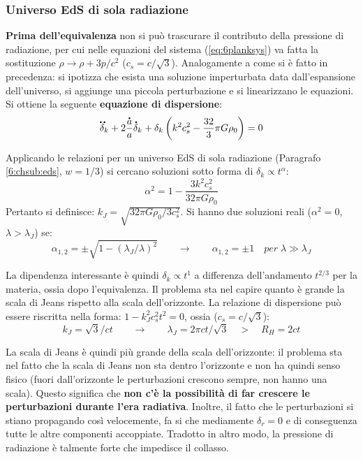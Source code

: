 \subsubsection{Universo EdS di sola radiazione}
\textbf{Prima dell'equivalenza} non si può trascurare il contributo della pressione di radiazione, per cui nelle equazioni del sistema (\ref{eq:6planksys}) va fatta la sostituzione $\rho \rightarrow \rho + 3p/c^2$ ($c_s=c/\sqrt{3}$). Analogamente a come si è fatto in precedenza: si ipotizza che esista una soluzione imperturbata data dall'espansione dell'universo, si aggiunge una piccola perturbazione e si linearizzano le equazioni. Si ottiene la seguente \textbf{equazione di dispersione}:
\begin{equation}
    \accentset{\mbox{\large\bfseries ..}}{\delta}_k + 2 \frac{\accentset{\mbox{\large\bfseries .}}{a}}{a}\accentset{\mbox{\large\bfseries .}}{\delta}_k + \delta_k \left( k^2 c_s^2 -\frac{32}{3}\pi G \rho_0\right) =0
\end{equation}

Applicando le relazioni per un universo EdS di sola radiazione (Paragrafo \ref{6:chsub:eds}, $w=1/3$) si cercano soluzioni sotto forma di $\delta_k \propto t^{\alpha}$:
\begin{equation*}
    \alpha^2 = 1-\frac{3k^2c_s^2}{32 \pi G\rho_0}
\end{equation*}
Pertanto si definisce: $k_J=\sqrt{32\pi G \rho_0 / 3c_s^2}$. Si hanno due soluzioni reali ($\alpha^2=0$, $\lambda >\lambda_J$) se:
\begin{equation*}
    \alpha_{1,2}=\pm \sqrt{1-\left( \lambda_J /\lambda\right)^2}\qquad \rightarrow \qquad \alpha_{1,2}=\pm 1 \quad per\; \lambda \gg \lambda_J
\end{equation*}

La dipendenza interessante è quindi $\delta_k \propto t^1$ a differenza dell'andamento $t^{2/3}$ per la materia, ossia dopo l'equivalenza. Il problema sta nel capire quanto è grande la scala di Jeans rispetto alla scala dell'orizzonte. La relazione di dispersione può essere riscritta nella forma: $1-k_J^2c_s^2t^2 = 0$, ossia ($c_s=c/\sqrt{3}$): 
\begin{equation*}
    k_J = \sqrt{3}/ct \qquad\rightarrow \qquad \lambda_J = 2\pi c t /\sqrt{3} \quad > \quad R_H = 2ct
\end{equation*}

La scala di Jeans è quindi più grande della scala dell'orizzonte: il problema sta nel fatto che la scala di Jeans non sta dentro l'orizzonte e non ha quindi senso fisico (fuori dall'orizzonte le perturbazioni crescono sempre, non hanno una scala). Questo significa che \textbf{non c'è la possibilità di far crescere le perturbazioni durante l'era radiativa}. Inoltre, il fatto che le perturbazioni si stiano propagando così velocemente, fa si che mediamente $\delta_r =0$ e di conseguenza tutte le altre componenti accoppiate. Tradotto in altro modo, la pressione di radiazione è talmente forte che impedisce il collasso.

